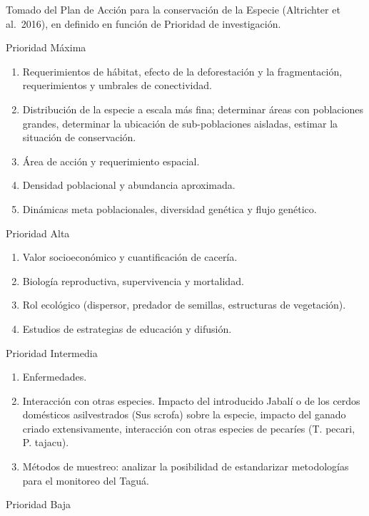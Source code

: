 \documentclass[
  x11names]{article}
\begin{document}
Tomado del Plan de Acción para la conservación de la Especie (Altrichter
et al.~2016), en definido en función de Prioridad de investigación.

Prioridad Máxima

\begin{enumerate}
\def\labelenumi{\arabic{enumi}.}
\item
  Requerimientos de hábitat, efecto de la deforestación y la
  fragmentación, requerimientos y umbrales de conectividad.
\item
  Distribución de la especie a escala más fina; determinar áreas con
  poblaciones grandes, determinar la ubicación de sub-poblaciones
  aisladas, estimar la situación de conservación.
\item
  Área de acción y requerimiento espacial.
\item
  Densidad poblacional y abundancia aproximada.
\item
  Dinámicas meta poblacionales, diversidad genética y flujo genético.
\end{enumerate}

Prioridad Alta~

\begin{enumerate}
\def\labelenumi{\arabic{enumi}.}
\setcounter{enumi}{5}
\item
  Valor socioeconómico y cuantificación de cacería.
\item
  Biología reproductiva, supervivencia y mortalidad.
\item
  Rol ecológico (dispersor, predador de semillas, estructuras de
  vegetación).
\item
  Estudios de estrategias de educación y difusión.
\end{enumerate}

Prioridad Intermedia

\begin{enumerate}
\def\labelenumi{\arabic{enumi}.}
\setcounter{enumi}{9}
\item
  Enfermedades.
\item
  Interacción con otras especies. Impacto del introducido Jabalí o de
  los cerdos domésticos asilvestrados (Sus scrofa) sobre la especie,
  impacto del ganado criado extensivamente, interacción con otras
  especies de pecaríes (T. pecari, P. tajacu).
\item
  Métodos de muestreo: analizar la posibilidad de estandarizar
  metodologías para el monitoreo del Taguá.
\end{enumerate}

Prioridad Baja~
\end{document}
